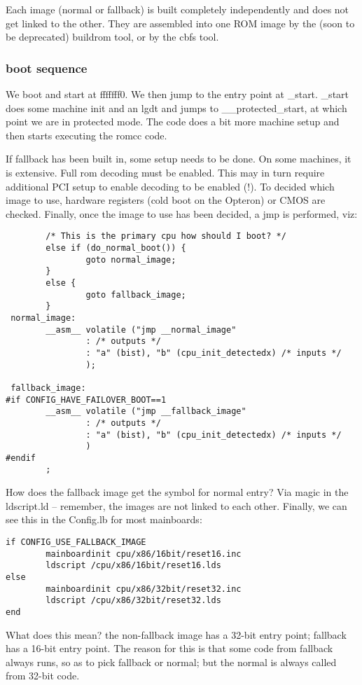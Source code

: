 \documentclass[titlepage,12pt]{article}
\begin{document}
Each image (normal or fallback) is built completely independently and does not get linked to the other. They are assembled into one ROM image by the (soon to be deprecated) buildrom tool, or by the cbfs tool. 

\subsubsection{boot sequence}
We boot and start at fffffff0. We then jump to the entry point at \_start.  \_start does some machine init and an lgdt and jumps to \_\_protected\_start, at which point we are in protected mode. The code does a bit more machine setup and then starts executing the romcc code. 

If fallback has been built in, some setup needs to be done. On some machines, it is extensive. Full rom decoding must be enabled. This may in turn require additional PCI setup to enable decoding to be enabled (!). To decided which image to use, hardware registers (cold boot on the Opteron) or CMOS are checked. Finally, once the image to use has been decided, a jmp is performed, viz: 
\begin{verbatim}
        /* This is the primary cpu how should I boot? */
        else if (do_normal_boot()) {
                goto normal_image;
        }
        else {
                goto fallback_image;
        }
 normal_image:
        __asm__ volatile ("jmp __normal_image"
                : /* outputs */
                : "a" (bist), "b" (cpu_init_detectedx) /* inputs */
                );

 fallback_image:
#if CONFIG_HAVE_FAILOVER_BOOT==1
        __asm__ volatile ("jmp __fallback_image"
                : /* outputs */
                : "a" (bist), "b" (cpu_init_detectedx) /* inputs */
                )
#endif
        ;
\end{verbatim}
How does the fallback image get the symbol for normal entry? Via magic in the ldscript.ld -- remember, the images are not linked to each other. 
Finally, we can see this in the Config.lb for most mainboards: 
\begin{verbatim}
if CONFIG_USE_FALLBACK_IMAGE
        mainboardinit cpu/x86/16bit/reset16.inc
        ldscript /cpu/x86/16bit/reset16.lds
else
        mainboardinit cpu/x86/32bit/reset32.inc
        ldscript /cpu/x86/32bit/reset32.lds
end
\end{verbatim}
What does this mean? the non-fallback image has a 32-bit entry point; fallback has a 16-bit entry point. The reason for this is that some code from fallback always runs, so as to pick fallback or normal; but the normal is always called from 32-bit code. 
\end{document}
